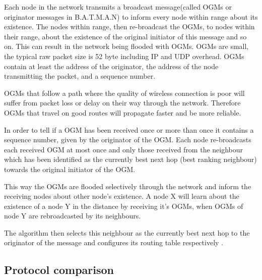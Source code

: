 Each node in the network transmits a broadcast message(called OGMs or originator messages in B.A.T.M.A.N) to inform every node within range about its existence.
The nodes within range, then re-broadcast the OGMs, to nodes within their range, about the existence of the original initiator of this message and so on.
This can result in the network being flooded with OGMs.
OGMs are small, the typical raw packet size is 52 byte including IP and UDP overhead\cite{BATMAN}.
OGMs contain at least the address of the originator, the address of the node transmitting the packet, and a sequence number.

OGMs that follow a path where the quality of wireless connection is poor will suffer from packet loss or delay on their way through the network.
Therefore OGMs that travel on good routes will propagate faster and be more reliable\cite{BATMAN}.

In order to tell if a OGM has been received once or more than once it contains a sequence number, given by the originator of the OGM.
Each node re-broadcasts each received OGM at most once and only those received from the neighbour which has been identified as the currently best next hop (best ranking neighbour) towards the original initiator of the OGM.

This way the OGMs are flooded selectively through the network and inform the receiving nodes about other node's existence. 
A node X will learn about the existence of a node Y in the distance by receiving it's OGMs, when OGMs of node Y are rebroadcasted by its neighbours.

The algorithm then selects this neighbour as the currently best next hop to the originator of the message and configures its routing table respectively \cite{BATMAN}.

\subsection{Protocol comparison}


